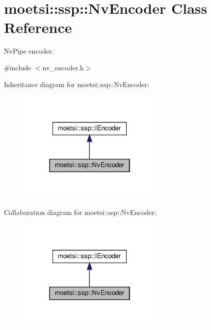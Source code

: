 \hypertarget{classmoetsi_1_1ssp_1_1NvEncoder}{}\section{moetsi\+:\+:ssp\+:\+:Nv\+Encoder Class Reference}
\label{classmoetsi_1_1ssp_1_1NvEncoder}


Nv\+Pipe encoder.  




{\ttfamily \#include $<$nv\+\_\+encoder.\+h$>$}



Inheritance diagram for moetsi\+:\+:ssp\+:\+:Nv\+Encoder\+:
\nopagebreak
\begin{figure}[H]
\begin{center}
\leavevmode
\includegraphics[width=202pt]{classmoetsi_1_1ssp_1_1NvEncoder__inherit__graph}
\end{center}
\end{figure}


Collaboration diagram for moetsi\+:\+:ssp\+:\+:Nv\+Encoder\+:
\nopagebreak
\begin{figure}[H]
\begin{center}
\leavevmode
\includegraphics[width=202pt]{classmoetsi_1_1ssp_1_1NvEncoder__coll__graph}
\end{center}
\end{figure}
